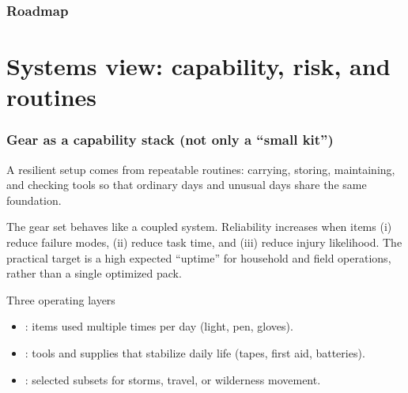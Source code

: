 \begin{frame}[t,shrink=20]
  \frametitle{Roadmap}
  \tableofcontents
\end{frame}

\section{Systems view: capability, risk, and routines}

\begin{frame}[t]
  \frametitle{Gear as a capability stack (not only a ``small kit'')}
  \justifying
   A resilient setup comes from repeatable routines: carrying, storing, maintaining, and checking tools so that ordinary days and unusual days share the same foundation.

  \vspace{0.6em}
   The gear set behaves like a coupled system. Reliability increases when items (i) reduce failure modes, (ii) reduce task time, and (iii) reduce injury likelihood. The practical target is a high expected ``uptime'' for household and field operations, rather than a single optimized pack.

  \vspace{0.8em}
  \begin{block}{Three operating layers}
    \begin{itemize}
      \item {}: items used multiple times per day (light, pen, gloves).
      \item {}: tools and supplies that stabilize daily life (tapes, first aid, batteries).
      \item {}: selected subsets for storms, travel, or wilderness movement.
    \end{itemize}
  \end{block}
\end{frame}


